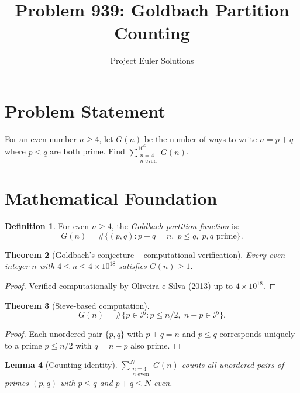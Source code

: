 \documentclass[11pt]{article}
\title{Problem 939: Goldbach Partition Counting}
\author{Project Euler Solutions}
\date{}
\newtheorem{theorem}{Theorem}
\newtheorem{lemma}[theorem]{Lemma}
\theoremstyle{definition}
\newtheorem{definition}[theorem]{Definition}
\begin{document}
\maketitle

\section{Problem Statement}

For an even number $n \geq 4$, let $G(n)$ be the number of ways to write $n = p + q$ where $p \leq q$ are both prime. Find $\sum_{\substack{n=4 \\ n \text{ even}}}^{10^6} G(n)$.

\section{Mathematical Foundation}

\begin{definition}
For even $n \geq 4$, the \emph{Goldbach partition function} is:
\[
G(n) = \#\{(p, q) : p + q = n,\; p \leq q,\; p, q \text{ prime}\}.
\]
\end{definition}

\begin{theorem}[Goldbach's conjecture -- computational verification]
Every even integer $n$ with $4 \leq n \leq 4 \times 10^{18}$ satisfies $G(n) \geq 1$.
\end{theorem}

\begin{proof}
Verified computationally by Oliveira e Silva (2013) up to $4 \times 10^{18}$.
\end{proof}

\begin{theorem}[Sieve-based computation]
\[
G(n) = \#\{p \in \mathcal{P} : p \leq n/2,\; n - p \in \mathcal{P}\}.
\]
\end{theorem}

\begin{proof}
Each unordered pair $\{p, q\}$ with $p + q = n$ and $p \leq q$ corresponds uniquely to a prime $p \leq n/2$ with $q = n - p$ also prime.
\end{proof}

\begin{lemma}[Counting identity]
$\sum_{\substack{n=4 \\ n \text{ even}}}^{N} G(n)$ counts all unordered pairs of primes $(p, q)$ with $p \leq q$ and $p + q \leq N$ even.
\end{lemma}
\end{document}
